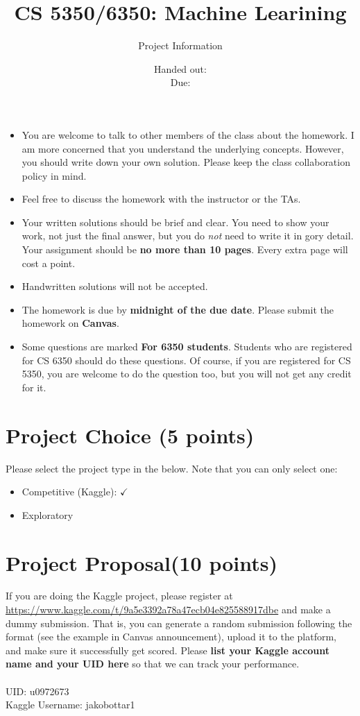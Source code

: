 \documentclass[12pt, fullpage,letterpaper]{article}
\title{CS 5350/6350: Machine Learining \semester}
\author{Project Information}
\date{Handed out: \releaseDate\\
  Due: \dueDate}
\begin{document}
\maketitle


\footnotesize
	\begin{itemize}
		\item You are welcome to talk to other members of the class about
		the homework. I am more concerned that you understand the
		underlying concepts. However, you should write down your own
		solution. Please keep the class collaboration policy in mind.
		
		\item Feel free to discuss the homework with the instructor or the TAs.
		
		\item Your written solutions should be brief and clear. You need to
		show your work, not just the final answer, but you do \emph{not}
		need to write it in gory detail. Your assignment should be {\bf no
			more than 10 pages}. Every extra page will cost a point.
		
		\item Handwritten solutions will not be accepted.
		
		\item The homework is due by \textbf{midnight of the due date}. Please submit
		the homework on \textbf{Canvas}.
		
		\item Some questions are marked {\bf For 6350 students}. Students
		who are registered for CS 6350 should do these questions. Of
		course, if you are registered for CS 5350, you are welcome to do
		the question too, but you will not get any credit for it.
		
	\end{itemize}



\section*{Project Choice (5 points)}

Please select the project type in the below. Note that you can only select one:
\begin{itemize}
	\item Competitive (Kaggle): $\checkmark$
	\item Exploratory
\end{itemize}


\section*{Project Proposal(10 points)} 
If you are doing the Kaggle project, please register at \url{https://www.kaggle.com/t/9a5e3392a78a47ecb04e825588917dbe}  and make a dummy submission. That is, you can generate a random submission following the format (see the example in Canvas announcement), upload it to the platform, and make sure it successfully get scored. Please \textbf{list your Kaggle account name and your UID here} so that we can track your performance. 
\\
\\
\noindent UID: u0972673 \\
Kaggle Username: jakobottar1
\end{document}
